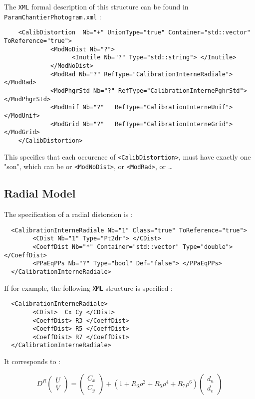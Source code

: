 The {\tt XML} formal description of this structure can be found in
{\tt ParamChantierPhotogram.xml} :



\begin{verbatim}
    <CalibDistortion  Nb="+" UnionType="true" Container="std::vector" ToReference="true">
             <ModNoDist Nb="?">
                   <Inutile Nb="?" Type="std::string"> </Inutile>
             </ModNoDist>
             <ModRad Nb="?" RefType="CalibrationInterneRadiale">     </ModRad>
             <ModPhgrStd Nb="?" RefType="CalibrationInternePghrStd"> </ModPhgrStd>
             <ModUnif Nb="?"   RefType="CalibrationInterneUnif">    </ModUnif>
             <ModGrid Nb="?"   RefType="CalibrationInterneGrid">    </ModGrid>
    </CalibDistortion>
\end{verbatim}


This specifies that each occurence of {\tt <CalibDistortion>}, must have exactly one "son", which can be
or {\tt <ModNoDist>}, or {\tt <ModRad>}, or \dots


\subsection{Radial Model}

\label{SpGeo:Rad}

The specification of a radial distorsion is  :


\begin{verbatim}
  <CalibrationInterneRadiale Nb="1" Class="true" ToReference="true">
        <CDist Nb="1" Type="Pt2dr"> </CDist>
        <CoeffDist Nb="*" Container="std::vector" Type="double"> </CoeffDist>
        <PPaEqPPs Nb="?" Type="bool" Def="false"> </PPaEqPPs>
  </CalibrationInterneRadiale>
\end{verbatim}

If for example, the following {\tt XML} structure is specified :

\begin{verbatim}
  <CalibrationInterneRadiale>
        <CDist>  Cx Cy </CDist>
        <CoeffDist> R3 </CoeffDist>
        <CoeffDist> R5 </CoeffDist>
        <CoeffDist> R7 </CoeffDist>
  </CalibrationInterneRadiale>
\end{verbatim}

It corresponds to :

\begin{equation}
   D^R\begin{pmatrix} U \\ V \end{pmatrix}
   =   \begin{pmatrix} C_x \\ C_y \end{pmatrix}
     + (1+R_3 \rho^2 + R_5 \rho^4 +  R_7 \rho^6  )\begin{pmatrix} d_u \\ d_v \end{pmatrix}
\end{equation}

